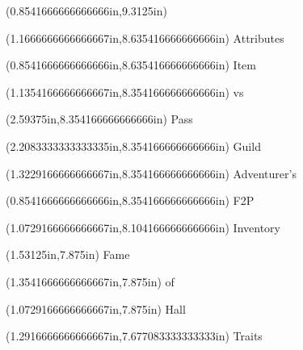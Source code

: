 \documentclass{article}
\begin{document}
\begin{textblock*}{8.0in}(0.8541666666666666in,9.3125in)
\fontsize{10.50}{12.60}
\end{textblock*}
\begin{textblock*}{8.0in}(1.1666666666666667in,8.635416666666666in)
\fontsize{10.50}{12.60}\selectfont
Attributes
\end{textblock*}
\begin{textblock*}{8.0in}(0.8541666666666666in,8.635416666666666in)
\fontsize{10.50}{12.60}\selectfont
Item
\end{textblock*}
\begin{textblock*}{8.0in}(1.1354166666666667in,8.354166666666666in)
\fontsize{8.25}{9.90}\selectfont
vs
\end{textblock*}
\begin{textblock*}{8.0in}(2.59375in,8.354166666666666in)
\fontsize{10.50}{12.60}\selectfont
Pass
\end{textblock*}
\begin{textblock*}{8.0in}(2.2083333333333335in,8.354166666666666in)
\fontsize{10.50}{12.60}\selectfont
Guild
\end{textblock*}
\begin{textblock*}{8.0in}(1.3229166666666667in,8.354166666666666in)
\fontsize{10.50}{12.60}\selectfont
Adventurer's
\end{textblock*}
\begin{textblock*}{8.0in}(0.8541666666666666in,8.354166666666666in)
\fontsize{10.50}{12.60}\selectfont
F2P
\end{textblock*}
\begin{textblock*}{8.0in}(1.0729166666666667in,8.104166666666666in)
\fontsize{12.75}{15.30}\selectfont
Inventory
\end{textblock*}
\begin{textblock*}{8.0in}(1.53125in,7.875in)
\fontsize{10.50}{12.60}\selectfont
Fame
\end{textblock*}
\begin{textblock*}{8.0in}(1.3541666666666667in,7.875in)
\fontsize{10.50}{12.60}\selectfont
of
\end{textblock*}
\begin{textblock*}{8.0in}(1.0729166666666667in,7.875in)
\fontsize{10.50}{12.60}\selectfont
Hall
\end{textblock*}
\begin{textblock*}{8.0in}(1.2916666666666667in,7.677083333333333in)
\fontsize{10.50}{12.60}\selectfont
Traits
\end{textblock*}
\end{document}

